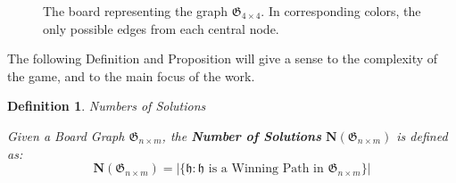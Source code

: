 \documentclass[conference]{IEEEtran}
\newtheorem{definition}{Definition}[section]
\begin{document}
\begin{figure}[ht]
\centering
{}
\caption{The board representing the graph $\mathfrak{G}_{4 \times 4}$. In corresponding colors, the only possible edges from each central node.}
\label{fig:dim_unsolvability_4x4}
\end{figure}

The following Definition and Proposition will give a sense to the complexity of the game, and to the main focus of the work.

\begin{definition}{Numbers of Solutions}{}
\label{def:number_of_solutions}

Given a Board Graph $\mathfrak{G}_{n \times m}$, the \textbf{Number of Solutions} $\mathbf{N}(\mathfrak{G}_{n \times m})$ is defined as:
$$
    \mathbf{N}(\mathfrak{G}_{n \times m}) = |\{\mathfrak{h} : \mathfrak{h} \text{ is a Winning Path in } \mathfrak{G}_{n \times m}\}|
$$

\end{definition}
\end{document}
